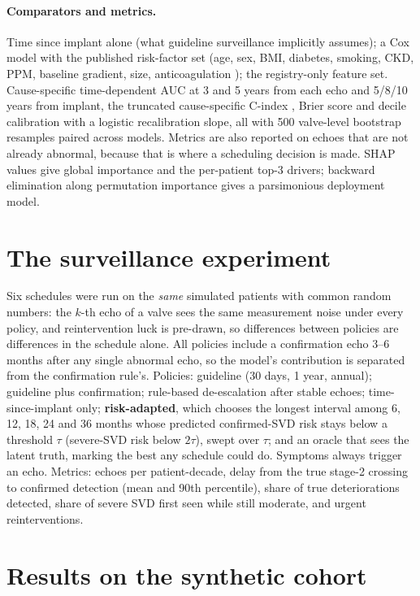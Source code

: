 \documentclass[11pt,a4paper]{article}
\begin{document}
\paragraph{Comparators and metrics.} Time since implant alone (what guideline surveillance implicitly assumes); a Cox model with the published risk-factor set (age, sex, BMI, diabetes, smoking, CKD, PPM, baseline gradient, size, anticoagulation \cite{trimaille2025}); the registry-only feature set. Cause-specific time-dependent AUC at 3 and 5 years from each echo and 5/8/10 years from implant, the truncated cause-specific C-index \cite{uno2011}, Brier score and decile calibration with a logistic recalibration slope, all with 500 valve-level bootstrap resamples paired across models. Metrics are also reported on echoes that are not already abnormal, because that is where a scheduling decision is made. SHAP values give global importance and the per-patient top-3 drivers; backward elimination along permutation importance gives a parsimonious deployment model.

\section{The surveillance experiment}\label{sec:policy}

Six schedules were run on the \emph{same} simulated patients with common random numbers: the $k$-th echo of a valve sees the same measurement noise under every policy, and reintervention luck is pre-drawn, so differences between policies are differences in the schedule alone. All policies include a confirmation echo 3--6 months after any single abnormal echo, so the model's contribution is separated from the confirmation rule's. Policies: guideline (30 days, 1 year, annual); guideline plus confirmation; rule-based de-escalation after stable echoes; time-since-implant only; \textbf{risk-adapted}, which chooses the longest interval among 6, 12, 18, 24 and 36 months whose predicted confirmed-SVD risk stays below a threshold $\tau$ (severe-SVD risk below $2\tau$), swept over $\tau$; and an oracle that sees the latent truth, marking the best any schedule could do. Symptoms always trigger an echo. Metrics: echoes per patient-decade, delay from the true stage-2 crossing to confirmed detection (mean and 90th percentile), share of true deteriorations detected, share of severe SVD first seen while still moderate, and urgent reinterventions.

\section{Results on the synthetic cohort}\label{sec:results}
\end{document}

